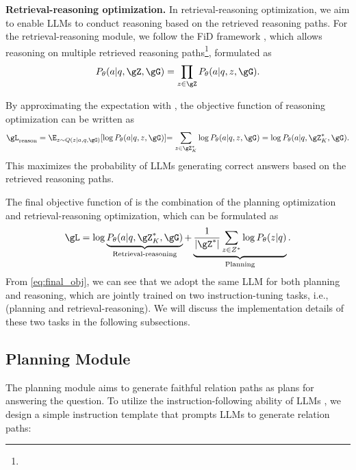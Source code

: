 \noindent\textbf{Retrieval-reasoning optimization.} In retrieval-reasoning optimization, we aim to enable LLMs to conduct reasoning based on the retrieved reasoning paths. 
For the retrieval-reasoning module, we follow the FiD framework \citep{izacard2021leveraging,singh2021end}, which allows reasoning on multiple retrieved reasoning paths\footnote{}, formulated as
\begin{equation}
    \setlength\abovedisplayskip{1pt}%
    \setlength\belowdisplayskip{1pt}
    P_\theta(a|q,\gZ,\gG) = \prod_{z\in\gZ}P_\theta(a|q,z,\gG).
\end{equation}

By approximating the expectation with , the objective function of reasoning optimization can be written as
\begin{equation}
    \setlength\abovedisplayskip{1pt}%
    \setlength\belowdisplayskip{1pt}
    \gL_{\text{reason}}= \E_{z\sim Q(z|a, q, \gG)}[\log P_\theta(a|q,z,\gG)] \RE{ = \sum_{z\in\gZ^*_K} \log P_\theta(a|q,z,\gG)} =  \log P_\theta(a|q,\gZ^*_{K},\gG).
\end{equation}
This maximizes the probability of LLMs generating correct answers based on the retrieved reasoning paths.

The final objective function of \ourmethod is the combination of the planning optimization and retrieval-reasoning optimization, which can be formulated as
\begin{equation}
    \setlength\abovedisplayskip{1pt}%
    \setlength\belowdisplayskip{1pt}
    \label{eq:final_obj}
    \gL = \log \underbrace{P_\theta(a|q,\RE{\gZ^*_K},\gG)}_{\text{Retrieval-reasoning}} + \underbrace{\RE{\frac{1}{|\gZ^*|}}\sum_{z\in \RE{Z^*}}\log P_\theta(z|q)}_{\text{Planning}}.
\end{equation}
From \eqref{eq:final_obj}, we can see that we adopt the same LLM for both planning and reasoning, which are jointly trained on two instruction-tuning tasks, i.e., (planning and retrieval-reasoning). We will discuss the implementation details of these two tasks in the following subsections.

\subsection{Planning Module}
The planning module aims to generate faithful relation paths as plans for answering the question. To utilize the instruction-following ability of LLMs \citep{wei2021finetuned}, we design a simple instruction template that prompts LLMs to generate relation paths:

